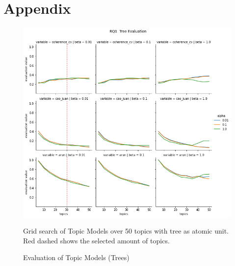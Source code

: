 \documentclass{article}
\begin{document}
    \section{Appendix}
    \begin{figure}[H]
        \begin{centering}
        \includegraphics[scale=0.4]{../Figure/H1_tree_red.png}
        \caption{Evaluation of Topic Models (Trees)}
        \end{centering}
        \begin{footnotesize} 
            Grid search of Topic Models over 50 topics with tree as atomic unit. Red dashed shows the selected amount of topics.         \end{footnotesize}
    \end{figure}
\end{document}
